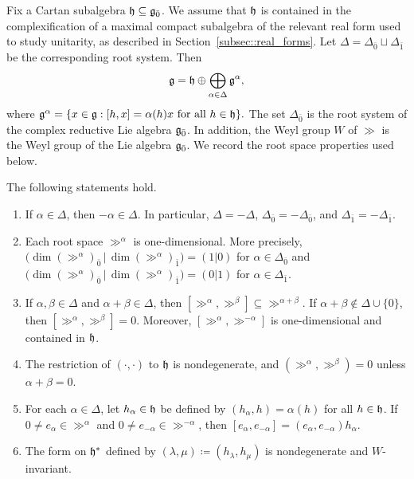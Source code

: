 Fix a Cartan subalgebra ${\mathfrak h}\subseteq{\mathfrak{g}_{\bar{0}}}$. We assume that ${\mathfrak h}$ is contained in the complexification of a maximal compact subalgebra of the relevant real form used to study unitarity, as described in Section~\ref{subsec::real_forms}. Let
$
\Delta=\Delta_{\bar0}\sqcup\Delta_{\bar1}
$
be the corresponding root system. Then
\begin{equation}
{\mathfrak{g}}
=
{\mathfrak h}\oplus\bigoplus_{\alpha\in\Delta}{\mathfrak{g}}^\alpha,
\end{equation}
where
$
{\mathfrak{g}}^\alpha
=
\{x\in{\mathfrak{g}}:[h,x]=\alpha(h)x
\text{ for all }h\in{\mathfrak h}\}.
$ The set $\Delta_{\bar0}$ is the root system of the complex reductive Lie algebra ${\mathfrak{g}_{\bar{0}}}$. In addition, the Weyl group $W$ of $\gg$ is the Weyl group of the Lie algebra ${\mathfrak{g}_{\bar{0}}}$. We record the root space properties used below.

\begin{proposition}
\label{prop::structure_theory_BCLSA}
The following statements hold.
\begin{enumerate}
    \item[(a)]
    If $\alpha\in\Delta$, then $-\alpha\in\Delta$. In particular,
    $\Delta=-\Delta$, $\Delta_{\bar0}=-\Delta_{\bar0}$, and
    $\Delta_{\bar1}=-\Delta_{\bar1}$.

    \item[(b)]
     Each root space $\gg^\alpha$ is one-dimensional. More precisely,
    $\bigl(\dim(\gg^\alpha)_{\bar0}\,\vert\,\dim(\gg^\alpha)_{\bar1}\bigr)=(1\vert0)$ for $\alpha\in\Delta_{\bar0}$ and
    $\bigl(\dim(\gg^\alpha)_{\bar0}\,\vert\,\dim(\gg^\alpha)_{\bar1}\bigr)=(0\vert1)$ for $\alpha\in\Delta_{\bar1}$.

    \item[(c)]
    If $\alpha,\beta\in\Delta$ and $\alpha+\beta\in\Delta$, then
    $
    [\gg^\alpha,\gg^\beta]\subseteq\gg^{\alpha+\beta}.
    $
    If $\alpha+\beta\notin\Delta\cup\{0\}$, then
    $[\gg^\alpha,\gg^\beta]=0$. Moreover,
    $[\gg^\alpha,\gg^{-\alpha}]$ is one-dimensional and contained in
    ${\mathfrak h}$.

    \item[(d)]
    The restriction of $(\cdot,\cdot)$ to ${\mathfrak h}$ is nondegenerate, and
    $
    (\gg^\alpha,\gg^\beta)=0
    $
    unless $\alpha+\beta=0$.

    \item[(e)]
    For each $\alpha\in\Delta$, let $h_\alpha\in{\mathfrak h}$ be defined by
    $
    (h_\alpha,h)=\alpha(h)
    $
    for all $h\in{\mathfrak h}$. If $0\neq e_\alpha\in\gg^\alpha$ and
    $0\neq e_{-\alpha}\in\gg^{-\alpha}$, then
    $
    [e_\alpha,e_{-\alpha}]
    =
    (e_\alpha,e_{-\alpha})h_\alpha.
    $

    \item[(f)]
    The form on ${\mathfrak h}^{\ast}$ defined by
    $
    (\lambda,\mu)\coloneqq (h_\lambda,h_\mu)
    $
    is nondegenerate and $W$-invariant.
\end{enumerate}
\end{proposition}


